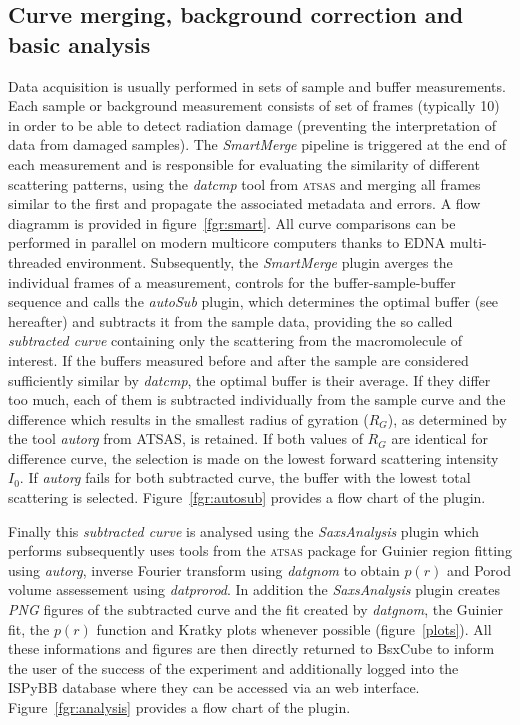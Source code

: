 \documentclass[preprint,pdf]{iucr}              %
\begin{document}
\subsection{Curve merging, background correction and basic analysis}
\label{SM}
Data acquisition is usually performed  in sets of sample and buffer measurements. 
Each sample or background measurement consists of set of frames
(typically 10) in order to be able to detect radiation damage 
(preventing the interpretation of data from damaged samples).
The \textit{SmartMerge} pipeline is triggered at the end of each measurement
and is responsible for evaluating the similarity of different scattering
patterns, using the \textit{datcmp} tool from \textsc{atsas} and merging all frames
similar to the first and propagate the associated metadata and errors.
A flow diagramm is provided in figure~\ref{fgr:smart}.
All curve comparisons can be performed in parallel on modern multicore
computers thanks to EDNA multi-threaded environment.
Subsequently, the \textit{SmartMerge} plugin averges the individual frames 
of a measurement, controls for the buffer-sample-buffer sequence and 
 calls the \textit{autoSub} plugin, which determines the optimal buffer
(see hereafter) and subtracts it from the sample data,  providing the so called
\textit{subtracted curve} containing only the scattering from the macromolecule
of interest.
If the buffers measured before and after the sample are considered sufficiently
similar by \textit{datcmp}, the optimal buffer is their average.
If they differ too much, each of them is subtracted individually from the
sample curve and the difference which results in  the smallest radius of gyration ($R_{G}$),
as determined by the tool \textit{autorg} from \textsc{ATSAS}, is retained.
If both values of $R_{G}$ are identical for difference curve, the selection is made on the lowest forward scattering intensity $I_{0}$. 
If \textit{autorg} fails for both subtracted curve, the buffer with the lowest total scattering is selected. 
Figure~\ref{fgr:autosub} provides a flow chart of the plugin.

Finally this \textit{subtracted curve} is analysed using the
\textit{SaxsAnalysis} plugin which performs subsequently uses tools from the \textsc{atsas} package for Guinier region fitting
using \textit{autorg}, inverse Fourier transform using \textit{datgnom} to obtain
$p(r)$ and Porod volume assessement using \textit{datprorod}.
In addition the \textit{SaxsAnalysis} plugin creates \textit{PNG} figures of
the subtracted curve and the fit created by \textit{datgnom}, the Guinier fit, the $p(r)$ function and Kratky plots whenever possible (figure~\ref{plots}).
All these informations and figures are then directly returned to BsxCube to inform the user
of the success of the experiment and additionally logged into the ISPyBB
database \cite{ispybb} where they can be accessed via an web interface.
Figure~\ref{fgr:analysis} provides a flow chart of the plugin.
\end{document}
